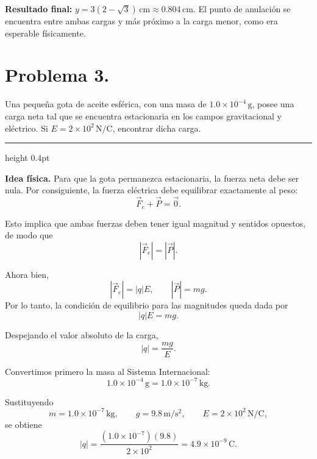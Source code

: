 \documentclass[11pt]{article}
\newcommand{\soluciontitulo}{%
  \par\medskip
  \noindent{\large\bfseries Solución.}\par
  \vspace{0.2em}\hrule height 0.4pt \vspace{0.7em}%
}
\newcommand{\resultadofinal}[1]{%
  \par\medskip
  \noindent\textbf{Resultado final:} #1\par
}
\begin{document}
\resultadofinal{$\boxed{y=3(2-\sqrt{3})\,\mathrm{cm}\approx 0.804\,\mathrm{cm}.}$ El punto de anulación se encuentra entre ambas cargas y más próximo a la carga menor, como era esperable físicamente.}

\clearpage

\section*{Problema 3.}
Una pequeña gota de aceite esférica, con una masa de $1.0\times 10^{-4}\,\mathrm{g}$, posee una carga neta tal que se encuentra estacionaria en los campos gravitacional y eléctrico. Si $E=2\times 10^2\,\mathrm{N/C}$, encontrar dicha carga.

\soluciontitulo

\textbf{Idea física.} Para que la gota permanezca estacionaria, la fuerza neta debe ser nula. Por consiguiente, la fuerza eléctrica debe equilibrar exactamente al peso:
\begin{equation*}
\vec F_e+\vec P=\vec 0.
\end{equation*}

Esto implica que ambas fuerzas deben tener igual magnitud y sentidos opuestos, de modo que
\begin{equation*}
|\vec F_e|=|\vec P|.
\end{equation*}

Ahora bien,
\begin{equation*}
|\vec F_e|=|q|E,
\qquad
|\vec P|=mg.
\end{equation*}
Por lo tanto, la condición de equilibrio para las magnitudes queda dada por
\begin{equation*}
|q|E=mg.
\end{equation*}

Despejando el valor absoluto de la carga,
\begin{equation*}
|q|=\frac{mg}{E}.
\end{equation*}

Convertimos primero la masa al Sistema Internacional:
\begin{equation*}
1.0\times 10^{-4}\,\mathrm{g}=1.0\times 10^{-7}\,\mathrm{kg}.
\end{equation*}

Sustituyendo
\begin{equation*}
m=1.0\times 10^{-7}\,\mathrm{kg},
\qquad
g=9.8\,\mathrm{m/s^2},
\qquad
E=2\times 10^2\,\mathrm{N/C},
\end{equation*}
se obtiene
\begin{equation*}
|q|
=
\frac{(1.0\times 10^{-7})(9.8)}{2\times 10^2}
=
4.9\times 10^{-9}\,\mathrm{C}.
\end{equation*}
\end{document}
